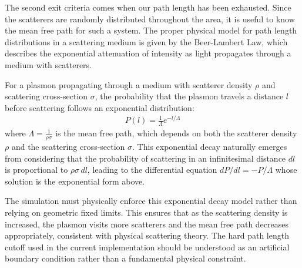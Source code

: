 The second exit criteria comes when our path length has been exhausted.
Since the scatterers are randomly distributed throughout the area, it is
useful to know the mean free path for such a system. The proper physical
model for path length distributions in a scattering medium is given by the
Beer-Lambert Law, which describes the exponential attenuation of intensity
as light propagates through a medium with scatterers.

For a plasmon propagating through a medium with scatterer density $\rho$
and scattering cross-section $\sigma$, the probability that the plasmon
travels a distance $l$ before scattering follows an exponential distribution:
\begin{align}
	P(l) = \frac{1}{\Lambda} e^{-l/\Lambda}
\end{align}
where $\Lambda = \frac{1}{\rho \sigma}$ is the mean free path, which
depends on both the scatterer density $\rho$ and the scattering
cross-section $\sigma$. This exponential decay naturally emerges from
considering that the probability of scattering in an infinitesimal distance
$dl$ is proportional to $\rho \sigma \, dl$, leading to the differential
equation $dP/dl = -P/\Lambda$ whose solution is the exponential form above.

The simulation must physically enforce this exponential decay model rather
than relying on geometric fixed limits. This ensures that as the scattering
density is increased, the plasmon visits more scatterers and the mean free
path decreases appropriately, consistent with physical scattering theory.
The hard path length cutoff used in the current implementation should be
understood as an artificial boundary condition rather than a fundamental
physical constraint.

